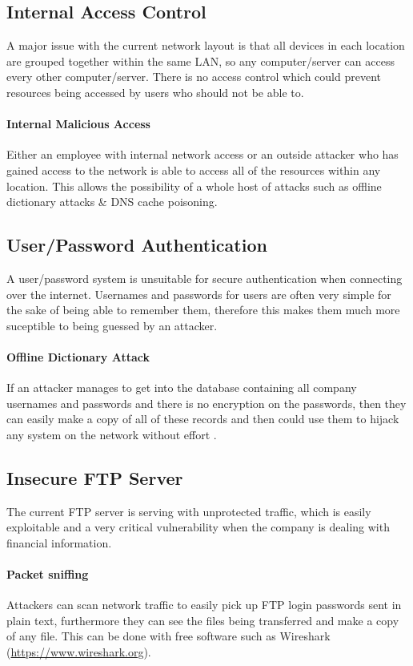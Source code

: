\documentclass[11pt]{article}
\begin{document}
    \subsection{Internal Access Control}
      A major issue with the current network layout is that all devices in each location are grouped together within the same LAN, so any computer/server can access every other computer/server. There is no access control which could prevent resources being accessed by users who should not be able to.

      \paragraph{Internal Malicious Access}
        Either an employee with internal network access or an outside attacker who has gained access to the network is able to access all of the resources within any location. This allows the possibility of a whole host of attacks such as offline dictionary attacks \& DNS cache poisoning.

    \subsection{User/Password Authentication}
      A user/password system is unsuitable for secure authentication when connecting over the internet. Usernames and passwords for users are often very simple for the sake of being able to remember them, therefore this makes them much more suceptible to being guessed by an attacker.

      \paragraph{Offline Dictionary Attack}
        If an attacker manages to get into the database containing all company usernames and passwords and there is no encryption on the passwords, then they can easily make a copy of all of these records and then could use them to hijack any system on the network without effort \citep{capecDictionary}.

    \subsection{Insecure FTP Server}
      The current FTP server is serving with unprotected traffic, which is easily exploitable and a very critical vulnerability when the company is dealing with financial information.

      \paragraph{Packet sniffing}
        Attackers can scan network traffic to easily pick up FTP login passwords sent in plain text, furthermore they can see the files being transferred and make a copy of any file. This can be done with free software such as Wireshark (\url{https://www.wireshark.org}).
\end{document}
